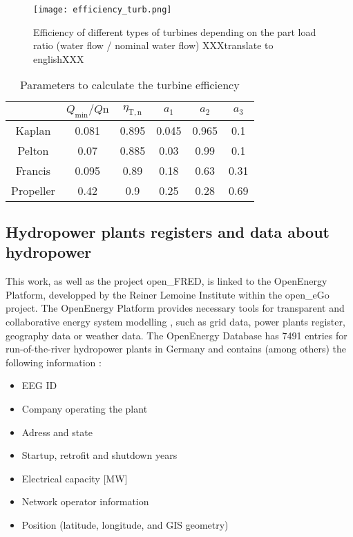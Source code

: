 \begin{figure}[H]
\texttt{[image: efficiency\_turb.png]}
\caption[Efficiency of different types of turbines depending on the part load ratio]{Efficiency of different types of turbines depending on the part load ratio (water flow / nominal water flow) \cite{raa89} XXXtranslate to englishXXX}
\centering
\label{efficiency_turb}
\end{figure}


\begin{table}
 \caption[Parameters to calculate the turbine efficiency]{Parameters to calculate the turbine efficiency \cite{quaschning}}
 \label{eff_param}
 \centering
 \begin{tabular}{|c|c|c|c|c|c|}
  \cline{2-6}
  \multicolumn{1}{c|}{}&$Q_\mathrm{min} / Q\mathrm{n}$ & $\eta_\mathrm{T,n}$& $a_\mathrm{1}$ & $a_\mathrm{2}$&$a_\mathrm{3}$ \\ 
  \hline
  Kaplan & 0.081& 0.895& 0.045 &0.965& 0.1 \\
  Pelton & 0.07& 0.885& 0.03& 0.99& 0.1\\
  Francis &0.095 &0.89 &0.18 &0.63 &0.31 \\
  Propeller &0.42 &0.9 &0.25 &0.28 &0.69\\
  \hline
 \end{tabular}
\end{table}


\subsection{Hydropower plants registers and data about hydropower}
\label{hpp_register}

This work, as well as the project open\_FRED, is linked to the OpenEnergy Platform, developped by the Reiner Lemoine Institute within the open\_eGo project. The OpenEnergy Platform provides necessary tools for transparent and collaborative energy system modelling \cite{oedb}, such as grid data, power plants register, geography data or weather data. The OpenEnergy Database has 7491 entries for run-of-the-river hydropower plants in Germany and contains (among others) the following information :
\begin{itemize}
\itemsep0em 
 \item EEG ID
 \item Company operating the plant
 \item Adress and state
 \item Startup, retrofit and shutdown years
 \item Electrical capacity [MW]
 \item Network operator information
 \item Position (latitude, longitude, and GIS geometry)
\end{itemize}


